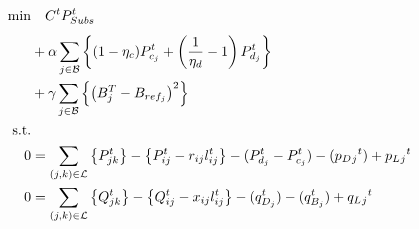 \begin{gather}
	\begin{align}
		\min_{
		} 
		\vspace{-15ex} %
		& \quad
		C^t P_{Subs}^t \\
		&+ \alpha \sum_{j \in \mathcal{B}} \left\{ (1- \eta_c)P_{c_j}^t + \left(\frac{1}{\eta_d}-1\right) P_{d_j}^t \right\} \nonumber\\
		&+ \gamma \sum_{j \in \mathcal{B}} \left\{ \left(B^{T}_{j} - B_{ref_{j}}\right)^2\right\} \nonumber\\
		\text{s.t.} & {}\nonumber\\
		{0} & = {\sum_{(j, k) \in \mathcal{L}} \left\{P_{jk}^t\right\} - \left\{P_{ij}^t - r_{ij}l_{ij}^t\right\} - (P_{d_j}^t - P_{c_j}^t)  - (p_D{_j}^t) + p_L{_j}^t} && \\
		{0} & = {\sum_{(j, k) \in \mathcal{L}} \left\{Q_{jk}^t\right\} - \left\{Q_{ij}^t - x_{ij}l_{ij}^t\right\} - (q_{D_j}^t) - (q_{B_j}^t) + q_L{_j}^t} && \\

\end{align}
\end{gather}
